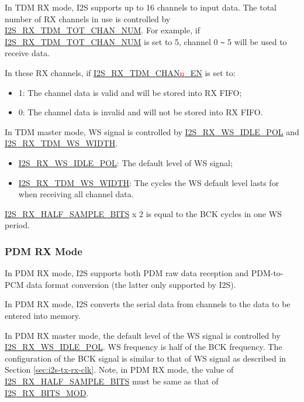 \documentclass[main\_\_EN.tex]{subfiles}
\begin{document}
In TDM RX mode, I2S supports up to 16 channels to input data. The total number of RX channels in use is controlled by \hyperref[fielddesc:I2SRXTDMTOTCHANNUM]{I2S\_RX\_TDM\_TOT\_CHAN\_NUM}. For example, if \hyperref[fielddesc:I2SRXTDMTOTCHANNUM]{I2S\_RX\_TDM\_TOT\_CHAN\_NUM} is set to 5, channel 0 \verb+~+ 5 will be used to receive data.

In these RX channels, if \hyperref[fielddesc:I2STXTDMCHAN0EN]{I2S\_RX\_TDM\_CHAN{\textcolor{red}{n}}\_EN} is set to:
\begin{itemize}
    \item 1: The channel data is valid and will be stored into RX FIFO;
    \item 0: The channel data is invalid and will not be stored into RX FIFO.
\end{itemize}
In TDM master mode, WS signal is controlled by \hyperref[fielddesc:I2SRXWSIDLEPOL]{I2S\_RX\_WS\_IDLE\_POL} and \hyperref[fielddesc:I2SRXTDMWSWIDTH]{I2S\_RX\_TDM\_WS\_WIDTH}.
\begin{itemize}
    \item \hyperref[fielddesc:I2SRXWSIDLEPOL]{I2S\_RX\_WS\_IDLE\_POL}: The default level of WS signal;
    \item \hyperref[fielddesc:I2SRXTDMWSWIDTH]{I2S\_RX\_TDM\_WS\_WIDTH}: The cycles the WS default level lasts for when receiving all channel data.
\end{itemize}

\hyperref[fielddesc:I2SRXHALFSAMPLEBITS]{I2S\_RX\_HALF\_SAMPLE\_BITS} x 2 is equal to the BCK cycles in one WS period.

\subsubsection{PDM RX Mode} 

In PDM RX mode, I2S supports both PDM raw data reception and PDM-to-PCM data format conversion (the latter only supported by I2S).

In PDM RX mode, I2S converts the serial data from channels to the data to be entered into memory.

In PDM RX master mode, the default level of the WS signal is controlled by \hyperref[fielddesc:I2SRXWSIDLEPOL]{I2S\_RX\_WS\_IDLE\_POL}. WS frequency is half of the BCK frequency. The configuration of the BCK signal is similar to that of WS signal as described in Section \ref{sec:i2s-tx-rx-clk}. Note, in PDM RX mode, the value of \hyperref[fielddesc:I2SRXHALFSAMPLEBITS]{I2S\_RX\_HALF\_SAMPLE\_BITS} must be same as that of \hyperref[fielddesc:I2SRXBITSMOD]{I2S\_RX\_BITS\_MOD}.
\end{document}
